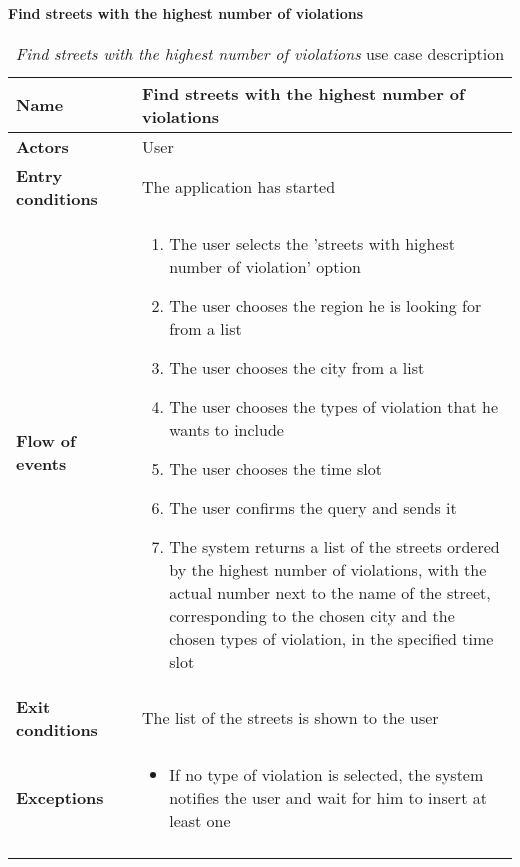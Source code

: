 		\paragraph{Find streets with the highest number of violations}
		\begin{longtable}{p{0.25\linewidth}p{0.75\linewidth}}
			\toprule
			\textbf{Name} & \textbf{Find streets with the highest number of violations} \\
			\midrule
			\textbf{Actors} & User \\
			\midrule
			\textbf{Entry conditions} & The application has started \\
			\midrule
			\textbf{Flow of events} & 
			\begin{enumerate}
				\item The user selects the 'streets with highest number of violation' option
				\item The user chooses the region he is looking for from a list
				\item The user chooses the city from a list
				\item The user chooses the types of violation that he wants to include
				\item The user chooses the time slot
				\item The user confirms the query and sends it
				\item The system returns a list of the streets ordered by the highest number of violations, with the actual number next to the name of the street, corresponding to the chosen city and the chosen types of violation, in the specified time slot
			\end{enumerate} \\
			\midrule
			\textbf{Exit conditions} & The list of the streets is shown to the user \\
			\midrule
			\textbf{Exceptions} & 
			\begin{itemize}
				\item 	If no type of violation is selected, the system notifies the user and wait for him to insert at least one	
			\end{itemize} \\
			\bottomrule
			\caption{\emph{Find streets with the highest number of violations} use case description}
		\end{longtable}
		
